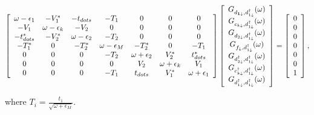  \begin{equation}
     \left[\begin{array}{ccccccc}
\omega-\epsilon_{1} & -V_{1}^{*} & -t_{dots} & -T_{1} & 0 & 0 & 0\\
-V_{1} & \omega-\epsilon_{k} & -V_{2} & 0 & 0 & 0 & 0\\
-t_{dots}^{*} & -V_{2}^{*} & \omega-\epsilon_{2} & -T_{2} & 0 & 0 & 0\\
-T_{1}^{*} & 0 & -T_{2}^{*} & \omega-\epsilon_{M} & -T_{2}^{*} & 0 & -T_{1}\\
0 & 0 & 0 & -T_{2} & \omega+\epsilon_{2} & V_{2}^{*} & t_{dots}^{*}\\
0 & 0 & 0 & 0 & V_{2} & \omega+\epsilon_{k} & V_{1}\\
0 & 0 & 0 & -T_{1} & t_{dots} & V_{1}^{*} & \omega+\epsilon_{1}
\end{array}\right]\left[\begin{array}{c}
G_{d_{\mathbf{1\downarrow}},d_{1\downarrow}^{\dagger}}(\omega)\\
G_{c_{k\downarrow},d_{1\downarrow}^{\dagger}}(\omega)\\
G_{d_{2\downarrow},d_{1\downarrow}^{\dagger}}(\omega)\\
G_{f_{\downarrow},d_{1\downarrow}^{\dagger}}(\omega)\\
G_{d_{2\downarrow}^{\dagger},d_{1\downarrow}^{\dagger}}(\omega)\\
G_{c_{k\downarrow}^{\dagger},d_{1\downarrow}^{\dagger}}(\omega)\\
G_{d_{1\downarrow}^{\dagger},d_{1\downarrow}^{\dagger}}(\omega)
\end{array}\right]=\left[\begin{array}{c}
0\\
0\\
0\\
0\\
0\\
0\\
1
\end{array}\right],
 \end{equation}
 
 where $T_i = \frac{t_1}{\sqrt{\omega+\epsilon_M}}$. 
 
